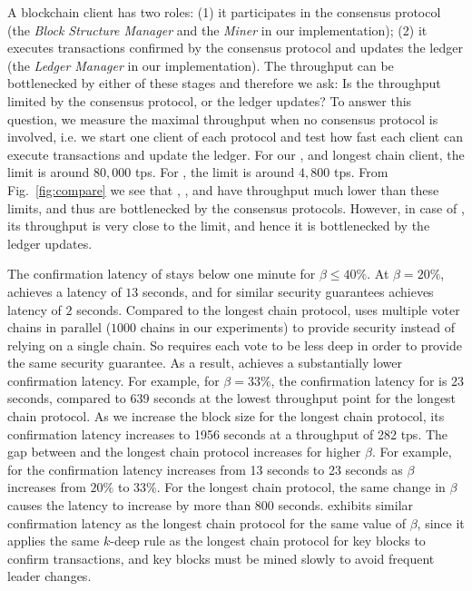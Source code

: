 A blockchain client has two roles: (1) it participates in the consensus protocol (the \textit{Block Structure Manager} and the \textit{Miner} in our implementation); (2) it executes transactions confirmed by the consensus protocol and updates the ledger (the \textit{Ledger Manager} in our implementation). The throughput can be bottlenecked by either of these stages and therefore we ask: Is the throughput limited by the consensus protocol, or the ledger updates? To answer this question, we measure the maximal throughput when no consensus protocol is involved, i.e. we start one client of each protocol and test how fast each client can execute transactions and update the ledger. For our \prism, \bng and longest chain client, the limit is around $80,000$ tps. For \algorand, the limit is around $4,800$ tps. From Fig.~\ref{fig:compare} we see that \bitcoin, \bng, and \algorand have throughput much lower than these limits, and thus are bottlenecked by the consensus protocols. However, in case of \prism, its throughput is very close to the limit, and hence it is bottlenecked by the ledger updates.

 The confirmation latency of \prism stays below one minute for $\beta \leq 40\%$. At $\beta = 20\%$, \prism achieves a latency of $13$ seconds, and for  similar security guarantees \algorand achieves latency of $2$ seconds. Compared to the longest chain protocol, \prism uses multiple voter chains in parallel ($1000$ chains in our experiments) to provide security instead of relying on a single chain. So \prism requires each vote to be less deep in order to provide the same security guarantee. As a result, \prism achieves a substantially lower confirmation latency. For example, for $\beta = 33\%$, the confirmation latency for \prism is 23 seconds, compared to 639 seconds at the lowest throughput point for the longest chain protocol. As we increase the block size for the longest chain protocol, its  confirmation latency increases to 1956 seconds at a throughput of 282 tps. The gap between \prism and the longest chain protocol increases for higher $\beta$. For example, for \prism the confirmation latency increases from 13 seconds to 23 seconds as $\beta$ increases from $20\%$ to $33\%$. For the longest chain protocol, the same change in $\beta$ causes the latency to increase by more than 800 seconds. \bng exhibits similar confirmation latency as the longest chain protocol for the same value of $\beta$, since it applies the same $k$-deep rule as the longest chain protocol for key blocks to confirm transactions, and key blocks must be mined slowly to avoid frequent leader changes.

